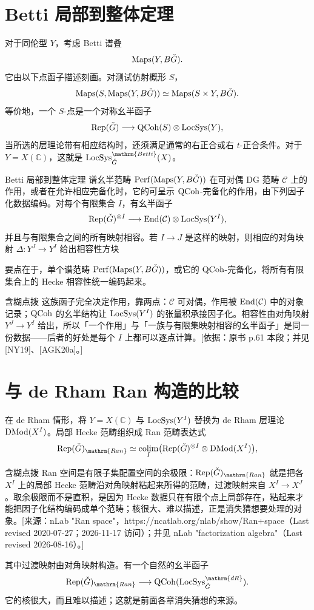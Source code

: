 \section{Betti 局部到整体定理}\label{sec:12.2}
对于同伦型 $Y$，考虑 Betti 谱叠
\[\operatorname{Maps}(Y,B\check{G}).\]
它由以下点函子描述刻画。对测试仿射概形 $S$，
\[\operatorname{Maps}(S,\operatorname{Maps}(Y,B\check{G}))\simeq\operatorname{Maps}(S\times Y,B\check{G}).\]
等价地，一个 $S$-点是一个对称幺半函子
\[\operatorname{Rep}(\check{G})\longrightarrow\operatorname{QCoh}(S)\otimes\operatorname{LocSys}(Y),\]
当所选的层理论带有相应结构时，还须满足通常的右正合或右 $t$-正合条件。对于 $Y=X(\mathbb C)$，这就是 $\LocSys^{\mathrm{Betti}}_{\checkG}(X)$。
\begin{theorem*}{Betti 局部到整体定理\cite{NY19,AGK20a}}
谱幺半范畴 $\operatorname{Perf}(\operatorname{Maps}(Y,B\check{G}))$ 在可对偶 DG 范畴 $\mathcal C$ 上的作用，或者在允许相应完备化时，它的可呈示 $\operatorname{QCoh}$-完备化的作用，由下列因子化数据编码。对每个有限集合 $I$，有幺半函子
\[\operatorname{Rep}(\check{G})^{\otimes I}\longrightarrow\operatorname{End}(\mathcal C)\otimes\operatorname{LocSys}(Y^I),\]
并且与有限集合之间的所有映射相容。若 $I\to J$ 是这样的映射，则相应的对角映射 $\Delta:Y^J\to Y^I$ 给出相容性方块
\end{theorem*}
要点在于，单个谱范畴 $\operatorname{Perf}(\operatorname{Maps}(Y,B\check{G}))$，或它的 $\operatorname{QCoh}$-完备化，将所有有限集合上的 Hecke 相容性统一编码起来。

\begin{transnote}{含糊点拨}
这族函子完全决定作用，靠两点：$\mathcal{C}$ 可对偶，作用被 $\operatorname{End}(\mathcal{C})$ 中的对象记录；$\operatorname{QCoh}$ 的幺半结构让 $\operatorname{LocSys}(Y^I)$ 的张量积承接因子化。相容性由对角映射 $Y^J\to Y^I$ 给出，所以「一个作用」与「一族与有限集映射相容的幺半函子」是同一份数据——后者的好处是每个 $I$ 上都可以逐点计算。[依据：原书 p.61 本段；并见 [NY19]、[AGK20a]。]
\end{transnote}

\section{与 de Rham Ran 构造的比较}\label{sec:12.3}
在 de Rham 情形，将 $Y=X(\mathbb C)$ 与 $\operatorname{LocSys}(Y^I)$ 替换为 de Rham 层理论 $\operatorname{DMod}(X^I)$。局部 Hecke 范畴组织成 Ran 范畴表达式
\[\Rep(\checkG)_{\mathrm{Ran}}\simeq\underset{I}{\operatorname{colim}}\bigl(\Rep(\checkG)^{\otimes I}\otimes\DMod(X^I)\bigr),\]

\begin{transnote}{含糊点拨}
Ran 空间是有限子集配置空间的余极限：$\Rep(\check G)_{\mathrm{Ran}}$ 就是把各 $X^I$ 上的局部 Hecke 范畴沿对角映射粘起来所得的范畴，过渡映射来自 $X^I\to X^J$。取余极限而不是直积，是因为 Hecke 数据只在有限个点上局部存在，粘起来才能把因子化结构编码成单个范畴；核很大、难以描述，正是消失猜想要处理的对象。[来源：nLab "Ran space"，https://ncatlab.org/nlab/show/Ran+space（Last revised 2020-07-27；2026-11-17 访问）；并见 nLab "factorization algebra"（Last revised 2026-08-16）。]
\end{transnote}
其中过渡映射由对角映射构造。有一个自然的幺半函子
\[\Rep(\checkG)_{\mathrm{Ran}}\longrightarrow\QCoh(\LocSys^{\mathrm{dR}}_{\checkG}).\]
它的核很大，而且难以描述；这就是前面各章消失猜想的来源。

